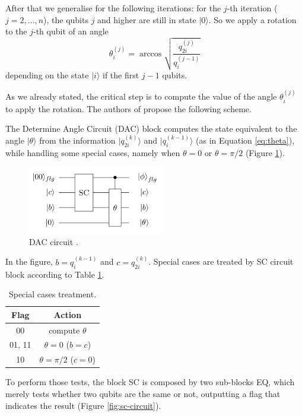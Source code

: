 \documentclass[a4paper, 10pt]{article}
\numberwithin{equation}{section}
\numberwithin{figure}{section}
\numberwithin{table}{section}
\begin{document}
After that we generalise for the following iterations: for the $j$-th iteration ($j=2,\dots,n$), the qubits $j$ and higher are still in state $|0\rangle$. So we apply a rotation to the $j$-th qubit of an angle
\begin{equation} \label{eq:theta}
	\theta_i^{(j)}=\arccos\sqrt{\frac{q_{2i}^{(j)}}{q_i^{(j-1)}}}
\end{equation}
depending on the state $|i\rangle$ if the first $j-1$ qubits.

As we already stated, the critical step is to compute the value of the angle $\theta_i^{(j)}$ to apply the rotation. The authors of \cite{chiang} propose the following scheme.

The Determine Angle Circuit (DAC) block computes the state equivalent to the angle $|\theta\rangle$ from the information $|q_{2i}^{(k)}\rangle$ and $|q_{i}^{(k-1)}\rangle$ (as in Equation \ref{eq:theta}), while handling some special cases, namely when $\theta=0$ or $\theta=\pi/2$ (Figure \ref{fig:dac-circuit}).

\begin{figure}[h!]
	\centering
	\includegraphics[width=6cm]{Figures/dac-circuit}
	\caption{DAC circuit \cite{chiang}.}
	\label{fig:dac-circuit}
\end{figure}

In the figure, $b=q_i^{(k-1)}$ and $c=q_{2i}^{(k)}$. Special cases are treated by SC circuit block according to Table \ref{tab:sc}.

\begin{table}[h!]
	\centering
	\caption{Special cases treatment.}
	\begin{tabular}{|c|c|}
		\hline
		Flag   & Action               \\ \hline
		00     & compute $\theta$     \\ 
		01, 11 & $\theta=0$ ($b=c$)     \\ 
		10     & $\theta=\pi/2$ ($c=0$) \\ \hline
	\end{tabular}
	\label{tab:sc}
\end{table}

To perform those tests, the block SC is composed by two sub-blocks EQ, which merely tests whether two qubits are the same or not, outputting a flag that indicates the result (Figure \ref{fig:sc-circuit}).
\end{document}
